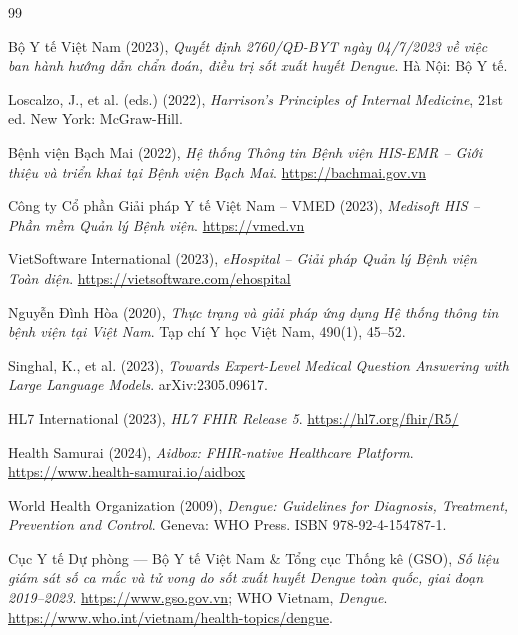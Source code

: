 \documentclass[a4paper,13pt,3p,oneside]{report}
\theoremstyle{definition}
\theoremstyle{remark}
\theoremstyle{definition}
\renewcommand{\bibname}{Tài liệu tham khảo}
\begin{document}
\newpage
\renewcommand\bibname{TÀI LIỆU THAM KHẢO}
\begin{thebibliography}{99}

 Bộ Y tế Việt Nam (2023), \textit{Quyết định 2760/QĐ-BYT ngày 04/7/2023 về việc ban hành hướng dẫn chẩn đoán, điều trị sốt xuất huyết Dengue}. Hà Nội: Bộ Y tế.

 Loscalzo, J., et al. (eds.) (2022), \textit{Harrison's Principles of Internal Medicine}, 21st ed. New York: McGraw-Hill.

 Bệnh viện Bạch Mai (2022), \textit{Hệ thống Thông tin Bệnh viện HIS-EMR -- Giới thiệu và triển khai tại Bệnh viện Bạch Mai}. \url{https://bachmai.gov.vn}

 Công ty Cổ phần Giải pháp Y tế Việt Nam -- VMED (2023), \textit{Medisoft HIS -- Phần mềm Quản lý Bệnh viện}. \url{https://vmed.vn}

 VietSoftware International (2023), \textit{eHospital -- Giải pháp Quản lý Bệnh viện Toàn diện}. \url{https://vietsoftware.com/ehospital}

 Nguyễn Đình Hòa (2020), \textit{Thực trạng và giải pháp ứng dụng Hệ thống thông tin bệnh viện tại Việt Nam}. Tạp chí Y học Việt Nam, 490(1), 45--52.

 Singhal, K., et al. (2023), \textit{Towards Expert-Level Medical Question Answering with Large Language Models}. arXiv:2305.09617.

 HL7 International (2023), \textit{HL7 FHIR Release 5}. \url{https://hl7.org/fhir/R5/}

 Health Samurai (2024), \textit{Aidbox: FHIR-native Healthcare Platform}. \url{https://www.health-samurai.io/aidbox}

 World Health Organization (2009), \textit{Dengue: Guidelines for Diagnosis, Treatment, Prevention and Control}. Geneva: WHO Press. ISBN 978-92-4-154787-1.

 Cục Y tế Dự phòng --- Bộ Y tế Việt Nam \& Tổng cục Thống kê (GSO), \textit{Số liệu giám sát số ca mắc và tử vong do sốt xuất huyết Dengue toàn quốc, giai đoạn 2019--2023}. \url{https://www.gso.gov.vn}; WHO Vietnam, \textit{Dengue}. \url{https://www.who.int/vietnam/health-topics/dengue}.


\end{thebibliography}
\end{document}
